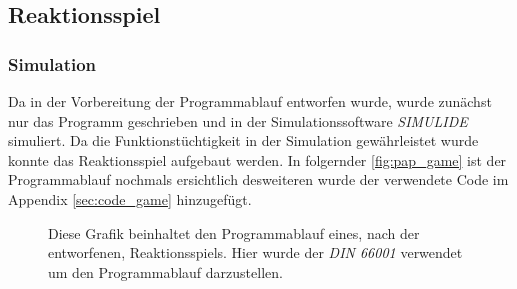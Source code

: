 \documentclass[12pt,english,ngerman]{scrartcl}
\begin{document}




\subsection{Reaktionsspiel}
\subsubsection{Simulation}

Da in der Vorbereitung der Programmablauf entworfen wurde, wurde
zunächst nur das Programm geschrieben und in der Simulationssoftware
\textit{SIMULIDE} simuliert. Da die Funktionstüchtigkeit in der
Simulation gewährleistet wurde konnte das Reaktionsspiel aufgebaut
werden. In folgernder \autoref{fig:pap_game} ist der Programmablauf
nochmals ersichtlich desweiteren wurde der verwendete Code im Appendix
\ref{sec:code_game} hinzugefügt.

\begin{figure}
  \begin{center}
  \end{center}
  \caption{Diese Grafik beinhaltet den Programmablauf eines, nach der
   entworfenen, Reaktionsspiels. Hier
  wurde der \textit{DIN 66001} verwendet um den Programmablauf
  darzustellen.}
  \label{fig:pap_game}
\end{figure}


\end{document}
